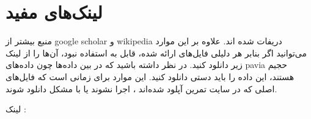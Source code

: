 \documentclass[a4paper, 12pt]{article}
\begin{document}
\section*{لینک‌های مفید}

منبع بیشتر از google scholar و wikipedia  دریفات شده اند. 
علاوه بر این موارد می‌توانید اگر بنابر هر دلیلی فایل‌های ارائه شده، قابل به استفاده نبود، آن‌ها را از لینک زیر دانلود کنید. در نظر داشته باشید که در بین داده‌ها چون داده‌های pavia حجیم هستند، این داده را باید دستی دانلود کنید. 
این موارد برای زمانی است که فایل‌های اصلی که در سایت تمرین آپلود شده‌اند ، اجرا نشوند یا با مشکل دانلود شوند.

لینک :
\href{https://drive.google.com/drive/folders/1Cbyk2rJ3-KZH08Wu43DTUZTl_uWAqt2_?usp=sharing}{}
\end{document}
